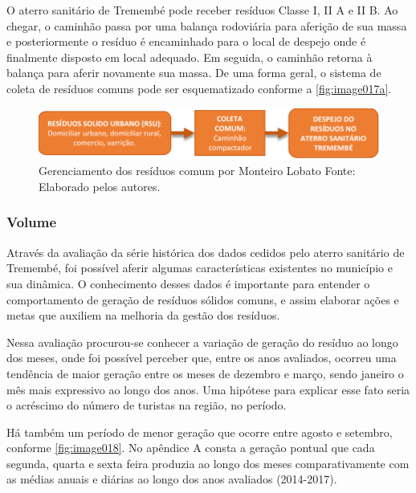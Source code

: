	O aterro sanitário de Tremembé pode receber resíduos Classe I, II A e II B. Ao chegar, o caminhão passa por uma balança rodoviária para aferição de sua massa e posteriormente o resíduo é encaminhado para o local de despejo onde é finalmente disposto em local adequado. Em seguida, o caminhão retorna à balança para aferir novamente sua massa.
	De uma forma geral, o sistema de coleta de resíduos comuns pode ser esquematizado conforme a \autoref{fig:image017a}.
	
	\begin{figure}
	\centering
	\includegraphics[width=0.75\linewidth]{produtos/prodtres/image017a}
	\caption{Gerenciamento dos resíduos comum por Monteiro Lobato Fonte: Elaborado pelos autores.}
	\label{fig:image017a}
\end{figure}
	
	\subsubsection{Volume}
	
	Através da avaliação da série histórica dos dados cedidos pelo aterro sanitário de Tremembé, foi possível aferir algumas características existentes no município e sua dinâmica. O conhecimento desses dados é importante para entender o comportamento de geração de resíduos sólidos comuns, e assim elaborar ações e metas que auxiliem na melhoria da gestão dos resíduos.
	
	Nessa avaliação procurou-se conhecer a variação de geração do resíduo ao longo dos meses, onde foi possível perceber que, entre os anos avaliados, ocorreu uma tendência de maior geração entre os meses de dezembro e março, sendo janeiro o mês mais expressivo ao longo dos anos. Uma hipótese para explicar esse fato seria o acréscimo do número de turistas na região, no período.
	
	Há também um período de menor geração que ocorre entre agosto e setembro, conforme \autoref{fig:image018}. No apêndice A consta a geração pontual que cada segunda, quarta e sexta feira produzia ao longo dos meses comparativamente com as médias anuais e diárias ao longo dos anos avaliados (2014-2017).
	
